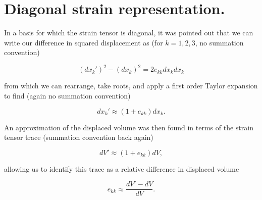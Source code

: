 \section{Diagonal strain representation.}

In a basis for which the strain tensor is diagonal, it was pointed out that we can write our difference in squared displacement as (for $k = 1, 2, 3$, no summation convention)

\begin{equation}\label{eqn:continuumElasticityReview:130}
(dx_k')^2 - (dx_k)^2 = 2 e_{kk} dx_k dx_k
\end{equation}

from which we can rearrange, take roots, and apply a first order Taylor expansion to find (again no summation convention)

\begin{equation}\label{eqn:continuumElasticityReview:150}
dx_k' \approx (1 + e_{kk}) dx_k.
\end{equation}

An approximation of the displaced volume was then found in terms of the strain tensor trace (summation convention back again)

\begin{equation}\label{eqn:continuumElasticityReview:170}
dV' \approx (1 + e_{kk}) dV,
\end{equation}

allowing us to identify this trace as a relative difference in displaced volume

\begin{equation}\label{eqn:continuumElasticityReview:190}
e_{kk} \approx \frac{dV' - dV}{dV}.
\end{equation}

